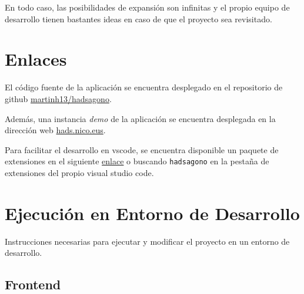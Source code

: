 \documentclass[12pt,epsf,titlepage,a4paper]{article}
\begin{document}
En todo caso, las posibilidades de expansión son infinitas y el propio equipo de desarrollo tienen bastantes ideas en caso de que el proyecto sea revisitado.
\pagebreak
%



\pagebreak

\appendix

\section{Enlaces} \label{enlaces}

El código fuente de la aplicación se encuentra desplegado en el repositorio de github \href{https://github.com/martinh13/hadsagono}{martinh13/hadsagono}.

Además, una instancia \emph{demo} de la aplicación se encuentra desplegada en la dirección web \href{https://hads.nico.eus/}{hads.nico.eus}.

Para facilitar el desarrollo en vscode, se encuentra disponible un paquete de extensiones en el siguiente \href{https://marketplace.visualstudio.com/items?itemName=nicoagr.hadsagono-vscodeextensions}{enlace} o buscando \verb|hadsagono| en la pestaña de extensiones del propio visual studio code.


\section{Ejecución en Entorno de Desarrollo}

Instrucciones necesarias para ejecutar y modificar el proyecto en un entorno de desarrollo.

\subsection{Frontend}
\end{document}
